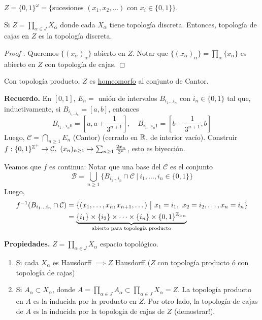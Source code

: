 \begin{eg}
	$Z = \{0,1\}^{\omega} = \{ \text{sucesiones } (x_1,x_2,\dots) \text{ con } x_i \in \{0,1\}  \}$.    
\end{eg}

\begin{lemma}
	Si $Z = \prod_{\alpha \in J} X_{\alpha}$ donde cada $X_{\alpha}$ tiene topología discreta. Entonces, topología de cajas en $Z$ es la topología discreta.
\end{lemma}

\begin{proof}[Proof ]
	Queremos $\{(x_{\alpha})_{\alpha}\}$ abierto en $Z$. Notar que $\{(x_{\alpha})_{\alpha}\} = \prod_{\alpha} \{x_{\alpha}\}$ es abierto en $Z$ con topología de cajas.   
\end{proof}

\noindent Con topología producto, $Z$ es \underline{homeomorfo} al conjunto de Cantor.\newline

\noindent \textbf{Recuerdo.} En $[0,1]$, $E_n =$ unión de intervalos $B_{i_1 \dots i_n}$ con $i_n \in \{0,1\}$ tal que, inductivamente, si $B_{i_{i_1\dots i_n}} = [a,b]$, entonces 
\[B_{i_1\dots i_n 0} = \left[ a, a+\frac{1}{3^{n+1}} \right],\quad B_{i_1\dots i_n 1} = \left[ b-\frac{1}{3^{n+1}}, b \right] \]
\noindent Luego, $\mathcal{C} = \bigcap_{n\geq 1} E_n$ (Cantor) (cerrado en $\mathbb{R}$, de interior vacío). Construir $f: \{0,1\}^{\mathbb{Z}^+} \to \mathcal{C},\ (x_n)_{n\geq 1} \mapsto \sum_{n\geq 1} \frac{2 x_n}{3^n}$, esto es biyección.\newline

\noindent Veamos que $f$ es continua: Notar que una base del $\mathcal{C}$ es el conjunto
\[ \mathcal{B} = \bigcup_{n \geq 1} \{B_{i_1\dots i_n} \cap \mathcal{C} \ \big| \ i_1,\dots,i_n \in \{0,1\}  \} \] 
Luego, 
\begin{align*}
	f^{-1}(B_{i_1\dots i_n} \cap \mathcal{C}) & = \{ (x_1,\dots,x_n,x_{n+1},\dots) \ \big| \ x_1 = i_1,\ x_2 = i_2, \dots, x_n = i_n \} \\
	& = \underbrace{\{i_1\} \times \{i_2\} \times \cdots \times \{i_n\} \times \{0,1\}^{\mathbb{Z}_{>n}}}_{\text{abierto para topología producto}}
\end{align*}

\noindent \textbf{Propiedades.} $Z = \prod_{\alpha \in J} X_{\alpha}$ espacio topológico.
\begin{enumerate}
	\item Si cada $X_{\alpha}$ es Hausdorff $\implies Z$ Hausdorff ($Z$ con topología producto ó con topología de cajas)

	\item Si $A_{\alpha} \subset X_{\alpha}$, donde $A = \prod_{\alpha \in J} A_{\alpha} \subset \prod_{\alpha \in J} X_{\alpha} = Z$. La topología producto en $A$ es la inducida por la producto en $Z$. Por otro lado, la topología de cajas de $A$ es la inducida por la topologia de cajas de $Z$ (demostrar!).
\end{enumerate}

